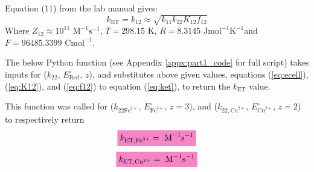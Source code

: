 Equation (11) from the lab manual\autocite{lab_manual} gives:
\begin{equation}
    k_{\text{ET}} = k_{12} \approx \sqrt{k_{11}k_{22}K_{12}f_{12}}
    \label{eq:ket}
\end{equation}
Where $Z_{12} \approx 10^{11} \text{ M}^{-1} \text{s}^{-1}$, $T = 298.15\text{ K}$, $R = 8.3145\text{ Jmol}^{-1}\text{K}^{-1}$and $F = 96485.3399 \text{ Cmol}^{-1}$.
\\
\par The below Python function (see Appendix \ref{appx:part1_code} for full script) takes inputs for ($k_{22}$, $E^{\circ}_{\text{Red}}$, $z$), and substitutes above given values, equations (\ref{eq:ecell}), (\ref{eq:K12}), and (\ref{eq:f12}) to equation (\ref{eq:ket}), to return the $k_{\text{ET}}$ value.

This function was called for ($k_{22 \text{Fe}^{3+}}$, $E^{\circ}_{\text{Fe}^{3+}}$, $z = 3$), and ($k_{22, \text{Cu}^{2+}}$, $E^{\circ}_{\text{Cu}^{2+}}$, $z = 2$) to respectively return
\begin{equation*}
    \mathcolorbox{Lavender}{k_{\text{ET},\text{Fe}^{3+}} =  \text{ M}^{-1} \text{s}^{-1}}
\end{equation*}
\begin{equation*}
    \mathcolorbox{Lavender}{k_{\text{ET},\text{Cu}^{2+}} =  \text{ M}^{-1} \text{s}^{-1}}
\end{equation*}
